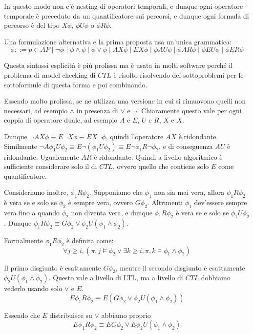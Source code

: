 In questo modo non c'è nesting di operatori temporali, e dunque ogni operatore temporale è preceduto da un quantificatore sui percorsi, e dunque ogni formula di percorso è del tipo \(X\phi\), \(\phi U \phi\) o \(\phi R \phi\).

Una formulazione alternativa e la prima proposta usa un'unica grammatica:
\[\phi ::= p \in AP \mid \neg \phi \mid \phi \land \phi \mid \phi \lor \phi \mid AX\phi \mid EX\phi \mid \phi AU \phi \mid \phi AR \phi \mid \phi EU \phi \mid \phi ER \phi\]

Questa sintassi esplicità è più prolissa ma è usata in molti software perché il problema di model checking di \(CTL\) è risolto risolvendo dei sottoproblemi per le sottoformule di questa forma e poi combinando.

Essendo molto prolissa, se ne utilizza una versione in cui si rimuovono quelli non necessari, ad esempio \(\land\) in presenza di \(\lor\) e \(\neg\).
Chiaramente questo vale per ogni coppia di operatore duale, ad esempio \(A\) e \(E\), \(U\) e \(R\), \(X\) e \(X\).

Dunque \(\neg AX\phi \equiv E\neg X \phi \equiv EX \neg \phi\), quindi l'operatore \(AX\) è ridondante.
Similmente \(\neg A \phi_1 U \phi_2 \equiv E \neg (\phi_1 U \phi_2) \equiv E \neg \phi_1 R \neg \phi_2\), e di conseguenza \(AU\) è ridondante. Ugualemente \(AR\) è ridondante. Quindi a livello algoritmico è sufficiente considerare solo il  di \(CTL\)\@, ovvero quello che contiene solo \(E\) come quantificatore.

Consideriamo inoltre, \(\phi_1 R \phi_2\). Supponiamo che \(\phi_1\) non sia mai vera, allora \(\phi_1 R \phi_2\) è vera se e solo se \(\phi_2\) è sempre vera, ovvero \(G\phi_2\). Altrimenti \(\phi_1\) dev'essere sempre vera fino a quando \(\phi_2\) non diventa vera, e dunque \(\phi_1 R \phi_2\) è vera se e solo se \(\phi_1 U \phi_2\). Dunque \(\phi_1 R \phi_2 \equiv G \phi_2 \lor \phi_2 U (\phi_1 \land \phi_2)\).

Formalmente \(\phi_1 R \phi_2\) è definita come:
\[\forall j \geq i, (\pi, j \models \phi_2 \lor \exists k \geq i, \pi, k \models \phi_1 \land \phi_2)\]

Il primo disgiunto è esattamente \(G\phi_2\), mentre il secondo disgiunto è esattamente \(\phi_2 U (\phi_1 \land \phi_2)\).
Questo vale a livello di LTL, ma a livello di \(CTL\) dobbiamo vederlo usando solo \(\lor\) e \(E\).
\[E \phi_1 R \phi_2 \equiv E(G\phi_2 \lor \phi_2 U(\phi_1 \land \phi_2))\]

Essendo che \(E\) distribuisce su \(\lor\) abbiamo proprio
\[E \phi_1 R \phi_2 \equiv E G\phi_2 \lor E \phi_2 U(\phi_1 \land \phi_2)\]


